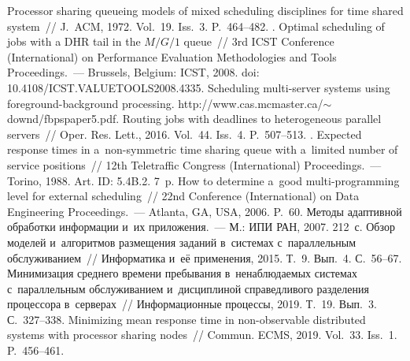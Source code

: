 \begin{multicols}{2}
{{\begin{thebibliography}{99}
    Processor sharing queueing models of mixed 
scheduling disciplines for time shared system~// J.~ACM, 1972. Vol.~19. Iss.~3. 
P.~464--482.
   . Optimal scheduling of jobs with a DHR tail in the 
$M/G/1$ queue~// 3rd ICST Conference (International) on Performance Evaluation 
Methodologies and Tools Proceedings.~--- Brussels, Belgium: ICST, 2008. doi: 
10.4108/ICST.VALUETOOLS2008.4335.
    Scheduling multi-server systems using  
foreground-background processing. {\sf 
http://www.\linebreak cas.mcmaster.ca/$\sim$downd/fbpspaper5.pdf}.
    Routing jobs with deadlines to 
heterogeneous parallel servers~// Oper. Res. Lett., 2016. Vol.~44. Iss.~4. 
P.~507--513.
   . Expected response times in a~non-symmetric time 
sharing queue with a~limited number of service positions~//  12th Teletraffic 
Congress (International) Proceedings.~--- Torino, 1988. Art. ID: 5.4B.2. 7~p.
How to determine a~good multi-programming level for external scheduling~//  22nd 
Conference  (International) on Data Engineering Proceedings.~--- Atlanta, GA, USA, 
2006. P.~60.
    Методы адаптивной обработки информации и~их 
приложения.~--- М.: ИПИ РАН, 2007. 212~с.
    Обзор моделей и~алгоритмов 
размещения заданий в~системах с~параллельным обслуживанием~// 
Информатика и~её применения, 2015. Т.~9. Вып.~4. С.~56--67.
    Минимизация среднего времени 
пребывания в~ненаблюдаемых сис\-те\-мах с~параллельным обслуживанием 
и~дисциплиной справедливого разделения процессора в~серверах~// 
Информационные процессы, 2019. Т.~19. Вып.~3. С.~327--338.
    Minimizing mean response time in  
non-observable distributed systems with processor sharing nodes~// Commun. 
 ECMS, 2019. Vol.~33. Iss.~1. P.~456--461.

 \end{thebibliography}

 }
 }

\end{multicols}

\vspace*{-9pt}

